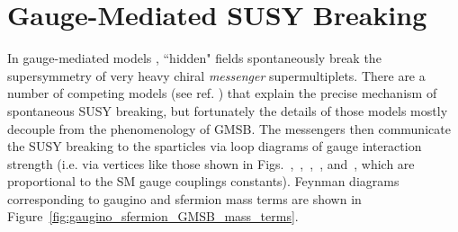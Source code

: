 \documentclass[dissertation.tex]{subfiles}
\begin{document}
\section{Gauge-Mediated SUSY Breaking}
\label{sec:Gauge-Mediated SUSY Breaking}

In gauge-mediated models \cite{GMSB}, ``hidden" fields spontaneously break the supersymmetry of very heavy chiral \textit{messenger} supermultiplets.  There are a number of competing models (see ref. \cite{GMSB}) that explain the precise mechanism of spontaneous SUSY breaking, but fortunately the details of those models mostly decouple from the phenomenology of GMSB.  The messengers then communicate the SUSY breaking to the sparticles via loop diagrams of gauge interaction strength (i.e. via vertices like those shown in Figs.~,~,~,~, and~, which are proportional to the SM gauge couplings constants).  Feynman diagrams corresponding to gaugino and sfermion mass terms are shown in Figure~\ref{fig:gaugino_sfermion_GMSB_mass_terms}.
\end{document}
